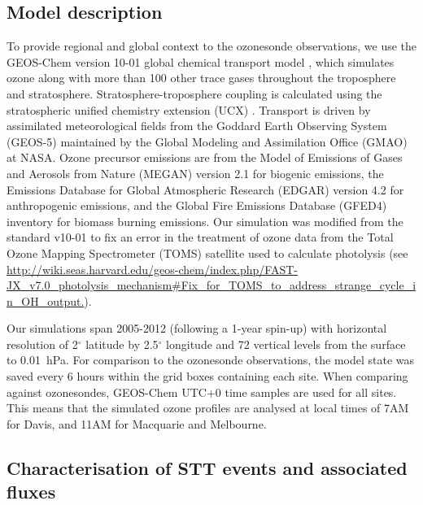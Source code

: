   \subsection{Model description}
    \label{Section:GEOSChemDescription}
    To provide regional and global context to the ozonesonde observations, we use the GEOS-Chem version 10-01 global chemical transport model \citep{Bey2001}, which simulates ozone along with more than 100 other trace gases throughout the troposphere and stratosphere. 
    Stratosphere-troposphere coupling is calculated using the stratospheric unified chemistry extension (UCX) \citep{Eastham2014}.
    Transport is driven by assimilated meteorological fields from the Goddard Earth Observing System (GEOS-5) maintained by the Global Modeling and Assimilation Office (GMAO) at NASA.
    Ozone precursor emissions are from the Model of Emissions of Gases and Aerosols from Nature (MEGAN) version 2.1 \citep{Guenther2012} for biogenic emissions, the Emissions Database for Global Atmospheric Research (EDGAR) version 4.2 for anthropogenic emissions, and the Global Fire Emissions Database (GFED4) inventory \citep{Giglio2013} for biomass burning emissions. 
    Our simulation was modified from the standard v10-01 to fix an error in the treatment of ozone data from the Total Ozone Mapping Spectrometer (TOMS) satellite used to calculate photolysis (see \url{http://wiki.seas.harvard.edu/geos-chem/index.php/FAST-JX_v7.0_photolysis_mechanism#Fix_for_TOMS_to_address_strange_cycle_in_OH_output.}).  

    Our simulations span 2005-2012 (following a 1-year spin-up) with horizontal resolution of 2$^{\circ}$ latitude by 2.5$^{\circ}$ longitude and 72 vertical levels from the surface to 0.01~hPa.
    For comparison to the ozonesonde observations, the model state was saved every 6 hours within the grid boxes containing each site.
    When comparing against ozonesondes, GEOS-Chem UTC+0 time samples are used for all sites.
    This means that the simulated ozone profiles are analysed at local times of 7AM for Davis, and 11AM for Macquarie and Melbourne.
    
  \subsection{Characterisation of STT events and associated fluxes}
    \label{Section:CharacterisationOfSTTs}
    
